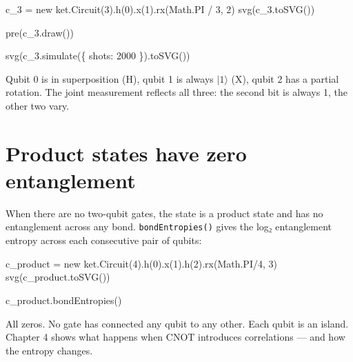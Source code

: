 \documentclass[
  11pt,
  letterpaper,
  oneside]{scrbook}
\newenvironment{Shaded}{\begin{snugshade}}{\end{snugshade}}
\newcommand{\NormalTok}[1]{\textcolor[rgb]{0.00,0.23,0.31}{#1}}
\begin{document}
\begin{Shaded}
\begin{Highlighting}[]
\NormalTok{c\_3 = new ket.Circuit(3).h(0).x(1).rx(Math.PI / 3, 2)}
\NormalTok{svg(c\_3.toSVG())}
\end{Highlighting}
\end{Shaded}

\begin{Shaded}
\begin{Highlighting}[]
\NormalTok{pre(c\_3.draw())}
\end{Highlighting}
\end{Shaded}

\begin{Shaded}
\begin{Highlighting}[]
\NormalTok{svg(c\_3.simulate(\{ shots: 2000 \}).toSVG())}
\end{Highlighting}
\end{Shaded}

Qubit 0 is in superposition (H), qubit 1 is always \(|1\rangle\) (X),
qubit 2 has a partial rotation. The joint measurement reflects all
three: the second bit is always 1, the other two vary.

\section{Product states have zero
entanglement}\label{product-states-have-zero-entanglement}

When there are no two-qubit gates, the state is a product state and has
no entanglement across any bond. \texttt{bondEntropies()} gives the log₂
entanglement entropy across each consecutive pair of qubits:

\begin{Shaded}
\begin{Highlighting}[]
\NormalTok{c\_product = new ket.Circuit(4).h(0).x(1).h(2).rx(Math.PI/4, 3)}
\NormalTok{svg(c\_product.toSVG())}
\end{Highlighting}
\end{Shaded}

\begin{Shaded}
\begin{Highlighting}[]
\NormalTok{c\_product.bondEntropies()}
\end{Highlighting}
\end{Shaded}

All zeros. No gate has connected any qubit to any other. Each qubit is
an island. Chapter 4 shows what happens when CNOT introduces
correlations --- and how the entropy changes.
\end{document}
